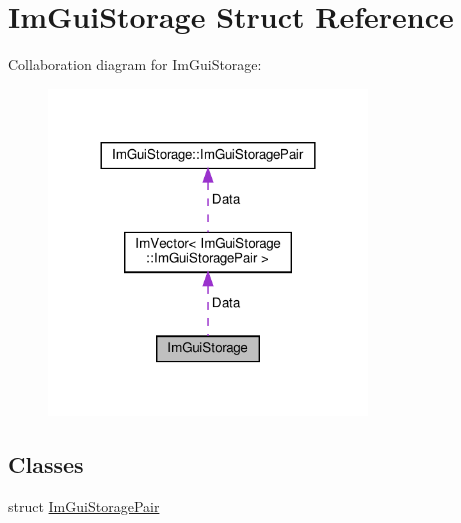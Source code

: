 \hypertarget{structImGuiStorage}{}\section{Im\+Gui\+Storage Struct Reference}
\label{structImGuiStorage}


Collaboration diagram for Im\+Gui\+Storage\+:\nopagebreak
\begin{figure}[H]
\begin{center}
\leavevmode
\includegraphics[width=240pt]{structImGuiStorage__coll__graph}
\end{center}
\end{figure}
\subsection*{Classes}
\begin{DoxyCompactItemize}
\item 
struct \hyperlink{structImGuiStorage_1_1ImGuiStoragePair}{Im\+Gui\+Storage\+Pair}
\end{DoxyCompactItemize}
